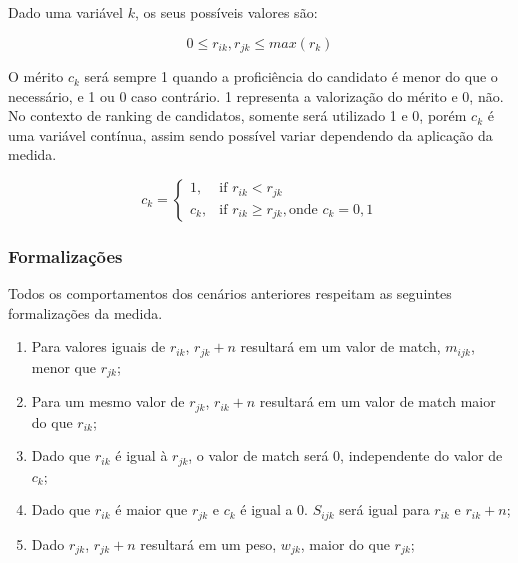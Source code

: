 \documentclass[preprint,12pt]{elsarticle}
\begin{document}
Dado uma variável $k$, os seus possíveis valores são:

\begin{equation}
0 \leq r_{ik}, r_{jk} \leq max(r_k)
\end{equation}

O mérito $c_{k}$ será sempre 1 quando a proficiência do candidato é menor do que o necessário, e 1 ou 0 caso contrário. 1 representa a valorização do mérito e 0, não. No contexto de ranking de candidatos, somente será utilizado 1 e 0, porém $c_{k}$ é uma variável contínua, assim sendo possível variar dependendo da aplicação da medida.

\begin{equation}
c_{k} = \begin{cases} 1, & \text{if } r_{ik} < r_{jk} \\ c_{k}, & \text{if } r_{ik} \geq r_{jk}, \text{onde } c_k = 0, 1 \end{cases}
\end{equation}

\subsubsection{Formalizações}

Todos os comportamentos dos cenários anteriores respeitam as seguintes formalizações da medida.

\begin{enumerate}
\item Para valores iguais de $r_{ik}$, $r_{jk} + n$ resultará em um valor de match, $m_{ijk}$, menor que $r_{jk}$;
\item Para um mesmo valor de $r_{jk}$, $r_{ik} + n$ resultará em um valor de match maior do que $r_{ik}$;
\item Dado que $r_{ik}$ é igual à $r_{jk}$, o valor de match será $0$, independente do valor de $c_{k}$;
\item Dado que $r_{ik}$ é maior que $r_{jk}$ e $c_k$ é igual a 0. $S_{ijk}$ será igual para $r_{ik}$ e $r_{ik} + n$; 
\item Dado $r_{jk}$, $r_{jk} + n$ resultará em um peso, $w_{jk}$, maior do que $r_{jk}$; 

\end{enumerate}
\end{document}
